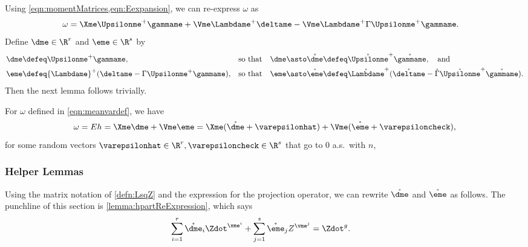\documentclass[main.tex]{subfiles}
\begin{document}
Using \cref{eqn:momentMatrices,eqn:Eexpansion}, we can re-express $\omega$ as
\begin{align*}
\omega
    &=
        \Xme \Upsilonme ^+ \gammame
        + \Vme \Lambdame ^+ \deltame
        - \Vme \Lambdame ^+ \Gamma \Upsilonme ^+ \gammame
        .
\end{align*}
Define $\dme \in \R^r$ and $\eme \in \R^s$ by
\begin{equation}
  \begin{aligned}
    \dme &\defeq \Upsilonme ^+ \gammame,
        &\text{so that}&&
          \dme &\asto \mathring {\dme} \defeq \mathring{\Upsilonme }^+ \mathring{\gammame}, \quad\text{and}\\
    \eme &\defeq {\Lambdame }^+({\deltame} - \Gamma {\Upsilonme }^+ {\gammame}),
        &\text{so that}&&
          \eme &\asto \mathring {\eme} \defeq \mathring{\Lambdame }^+(\mathring{\deltame} - \mathring \Gamma \mathring{\Upsilonme }^+ \mathring{\gammame}).
  \end{aligned}
  \label{eqn:zetaeta}
\end{equation}
Then the next lemma follows trivially.
\begin{lemma}\label{lemma:omegaExpansion}
For $\omega$ defined in \cref{eqn:meanvardef}, we have
\[\omega = Eh = \Xme \dme + \Vme \eme = \Xme(\mathring {\dme} + \varepsilonhat) + \Vme (\mathring {\eme} + \varepsiloncheck),\]
for some random vectors $\varepsilonhat \in \R^r, \varepsiloncheck \in \R^s$ that go to 0 a.s.\ with $n$,
\end{lemma}

\subsubsection{Helper Lemmas}

Using the matrix notation of \cref{defn:LsqZ} and the expression for the projection operator, we can rewrite $\mathring{\dme}$ and $\mathring{\eme}$ as follows.
The punchline of this section is \cref{lemma:hpartReExpression}, which says
\begin{align*}
  \sum_{i=1}^r \mathring{\dme}_i \Zdot^{\xme^i}
  +
  \sum_{j=1}^s \mathring{\eme}_j  Z^{\vme^j}
    &=
    \Zdot^g.
\end{align*}
\end{document}
